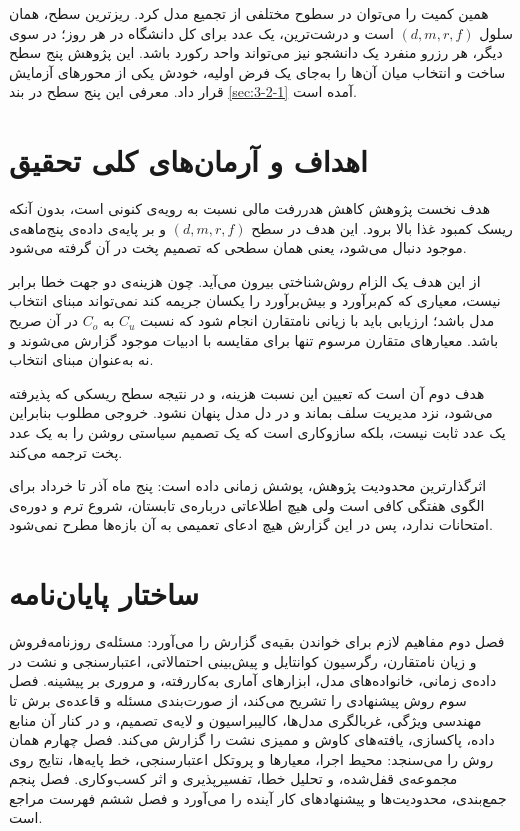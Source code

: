 همین کمیت را می‌توان در سطوح مختلفی از تجمیع مدل کرد. ریزترین سطح، همان سلول
$(d,m,r,f)$ است و درشت‌ترین، یک عدد برای کل دانشگاه در هر روز؛ در سوی دیگر، هر رزرو
منفرد یک دانشجو نیز می‌تواند واحد رکورد باشد. این پژوهش پنج سطح ساخت و انتخاب میان
آن‌ها را به‌جای یک فرض اولیه، خودش یکی از محورهای آزمایش قرار داد. معرفی این پنج سطح در
بند \ref{sec:3-2-1} آمده است.

\section{اهداف و آرمان‌های کلی تحقیق}
\label{sec:1-5}

هدف نخست پژوهش کاهش هدررفت مالی نسبت به رویه‌ی کنونی است، بدون آنکه ریسک کمبود غذا بالا
برود. این هدف در سطح $(d,m,r,f)$ و بر پایه‌ی داده‌ی پنج‌ماهه‌ی موجود دنبال می‌شود، یعنی
همان سطحی که تصمیم پخت در آن گرفته می‌شود.

از این هدف یک الزام روش‌شناختی بیرون می‌آید. چون هزینه‌ی دو جهت خطا برابر نیست، معیاری که
کم‌برآورد و بیش‌برآورد را یکسان جریمه کند نمی‌تواند مبنای انتخاب مدل باشد؛ ارزیابی باید با
زیانی نامتقارن انجام شود که نسبت $C_u$ به $C_o$ در آن صریح باشد. معیارهای متقارن مرسوم
تنها برای مقایسه با ادبیات موجود گزارش می‌شوند و نه به‌عنوان مبنای انتخاب.

هدف دوم آن است که تعیین این نسبت هزینه، و در نتیجه سطح ریسکی که پذیرفته می‌شود، نزد
مدیریت سلف بماند و در دل مدل پنهان نشود. خروجی مطلوب بنابراین یک عدد ثابت نیست، بلکه
سازوکاری است که یک تصمیم سیاستی روشن را به یک عدد پخت ترجمه می‌کند.

اثرگذارترین محدودیت پژوهش، پوشش زمانی داده است: پنج ماه آذر تا خرداد برای الگوی هفتگی
کافی است ولی هیچ اطلاعاتی درباره‌ی تابستان، شروع ترم و دوره‌ی امتحانات ندارد، پس در این
گزارش هیچ ادعای تعمیمی به آن بازه‌ها مطرح نمی‌شود.

\section{ساختار پایان‌نامه}
\label{sec:1-6}

فصل دوم مفاهیم لازم برای خواندن بقیه‌ی گزارش را می‌آورد: مسئله‌ی روزنامه‌فروش و زیان
نامتقارن، رگرسیون کوانتایل و پیش‌بینی احتمالاتی، اعتبارسنجی و نشت در داده‌ی زمانی،
خانواده‌های مدل، ابزارهای آماری به‌کاررفته، و مروری بر پیشینه. فصل سوم روش پیشنهادی را
تشریح می‌کند، از صورت‌بندی مسئله و قاعده‌ی برش تا مهندسی ویژگی، غربالگری مدل‌ها،
کالیبراسیون و لایه‌ی تصمیم، و در کنار آن منابع داده، پاکسازی، یافته‌های کاوش و ممیزی نشت
را گزارش می‌کند. فصل چهارم همان روش را می‌سنجد: محیط اجرا، معیارها و پروتکل اعتبارسنجی،
خط پایه‌ها، نتایج روی مجموعه‌ی قفل‌شده، و تحلیل خطا، تفسیرپذیری و اثر کسب‌وکاری. فصل پنجم
جمع‌بندی، محدودیت‌ها و پیشنهادهای کار آینده را می‌آورد و فصل ششم فهرست مراجع است.
